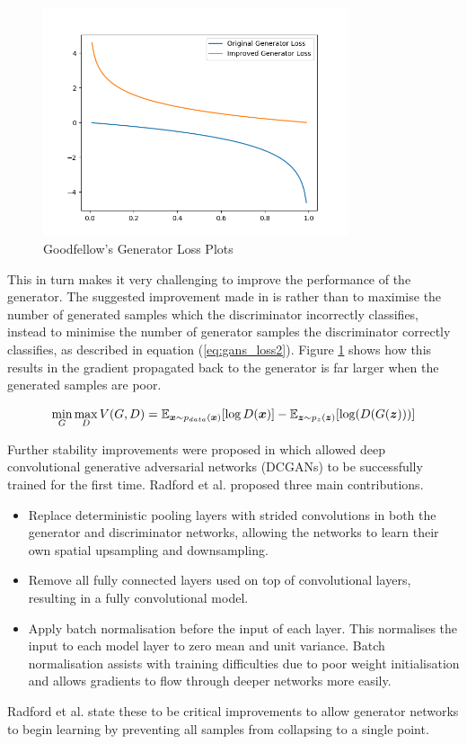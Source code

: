 \begin{figure}[h]
    \centering
        \includegraphics[width=0.8\textwidth]{figures/dl/goodfellow_gen_losses.png}
    \caption{Goodfellow's Generator Loss Plots \cite{Goodfellow2014}}\label{fig:Goodfellow_plot}
\end{figure}
\quad

This in turn makes it very challenging to improve the performance of the generator.
The suggested improvement made in \cite{Goodfellow2014} is rather than to maximise the number of generated samples which the discriminator incorrectly classifies, instead to minimise the number of generator samples the discriminator correctly classifies, as described in equation (\ref{eq:gans_loss2}).
Figure \ref{fig:Goodfellow_plot} shows how this results in the gradient propagated back to the generator is far larger when the generated samples are poor.

\begin{equation} \label{eq:gans_loss2}
    \min_{G} \max_{D} V(G, D) = \mathbb{E}_{{\boldsymbol{{x}}} \sim p_{data}({\boldsymbol{{x}}})} [\log D({\boldsymbol{{x}}})]
                              - \mathbb{E}_{{\boldsymbol{{z}}} \sim p_{z}({\boldsymbol{{z}}})} [\log (D(G({\boldsymbol{{z}}})))]
\end{equation}
\quad

Further stability improvements were proposed in \cite{Radford2016} which allowed deep convolutional generative adversarial networks (DCGANs) to be successfully trained for the first time.
Radford et al. proposed three main contributions.
\begin{itemize}
    \item Replace deterministic pooling layers with strided convolutions in both the generator and discriminator networks, allowing the networks to learn their own spatial upsampling and downsampling.
    \item Remove all fully connected layers used on top of convolutional layers, resulting in a fully convolutional model.
    \item Apply batch normalisation \cite{Ioffe2015} before the input of each layer.
    This normalises the input to each model layer to zero mean and unit variance.
    Batch normalisation assists with training difficulties due to poor weight initialisation and allows gradients to flow through deeper networks more easily.
\end{itemize}
Radford et al. state these to be critical improvements to allow generator networks to begin learning by preventing all samples from collapsing to a single point. 

